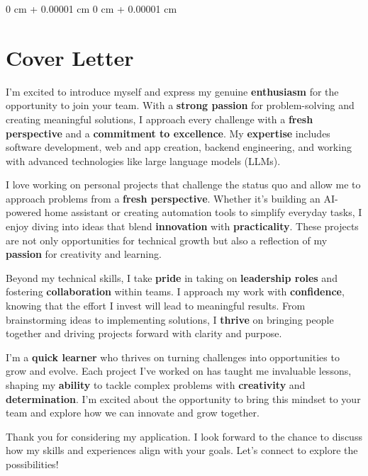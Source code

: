 \documentclass[10pt, letterpaper]{article}
\newenvironment{onecolentry}{
    \begin{adjustwidth}{
        0 cm + 0.00001 cm
    }{
        0 cm + 0.00001 cm
    }
}{
    \end{adjustwidth}
} %
\begin{document}
\begin{onecolentry}
	\section{Cover Letter}
	\hspace{1cm}I'm excited to introduce myself and express my genuine \textbf{enthusiasm} for the opportunity to join your team. With a \textbf{strong passion} for problem-solving and creating meaningful solutions, I approach every challenge with a \textbf{fresh perspective} and a \textbf{commitment to excellence}. My \textbf{expertise} includes software development, web and app creation, backend engineering, and working with advanced technologies like large language models (LLMs).

	\vspace{0.15cm}
	\hspace{1cm}I love working on personal projects that challenge the status quo and allow me to approach problems from a \textbf{fresh perspective}. Whether it's building an AI-powered home assistant or creating automation tools to simplify everyday tasks, I enjoy diving into ideas that blend \textbf{innovation} with \textbf{practicality}. These projects are not only opportunities for technical growth but also a reflection of my \textbf{passion} for creativity and learning.

	\vspace{0.15cm}
	\hspace{1cm}Beyond my technical skills, I take \textbf{pride} in taking on \textbf{leadership roles} and fostering \textbf{collaboration} within teams. I approach my work with \textbf{confidence}, knowing that the effort I invest will lead to meaningful results. From brainstorming ideas to implementing solutions, I \textbf{thrive} on bringing people together and driving projects forward with clarity and purpose.

	\vspace{0.15cm}
	\hspace{1cm}I'm a \textbf{quick learner} who thrives on turning challenges into opportunities to grow and evolve. Each project I've worked on has taught me invaluable lessons, shaping my \textbf{ability} to tackle complex problems with \textbf{creativity} and \textbf{determination}. I'm excited about the opportunity to bring this mindset to your team and explore how we can innovate and grow together.

	\vspace{0.15cm}
	\hspace{1cm}Thank you for considering my application. I look forward to the chance to discuss how my skills and experiences align with your goals. Let's connect to explore the possibilities!
\end{onecolentry}
\end{document}
